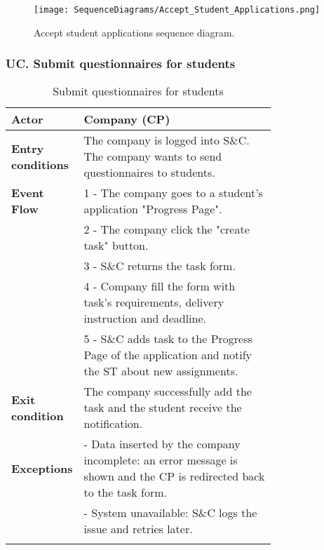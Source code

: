 \begin{figure}[H]
    \begin{center}
        \texttt{[image: SequenceDiagrams/Accept\_Student\_Applications.png]}
        \caption{Accept student applications sequence diagram.}
        \label{fig:accept_student_applications_seqd}%
    \end{center}
\end{figure}

\subsubsection*{UC\cuc . Submit questionnaires for students}
\begin{center}
    \begin{longtable}{|l|p{0.75\linewidth}|}
        \hline
        \textbf{Actor}            & Company (CP)\\
        \hline
        \textbf{Entry conditions} & The company is logged into S\&C. The company wants to send questionnaires to students.\\
        \hline
        \textbf{Event Flow}     & 1 - The company goes to a student’s application "Progress Page". \\
                                & 2 - The company click the "create task" button. \\
                                & 3 - S\&C returns the task form.\\
                                & 4 - Company fill the form with task’s requirements, delivery instruction and deadline.\\
                                & 5 -  S\&C adds task to the Progress Page of the application and notify the ST about new assignments.\\
        \hline
        \textbf{Exit condition}     & The company successfully add the task and the student receive the notification.\\       
        \hline
        \textbf{Exceptions}     & - Data inserted by the company incomplete: an error message is shown and the CP is redirected back to the task form. \\
                                & - System unavailable: S\&C logs the issue and retries later. \\
        \hline
        \caption{Submit questionnaires for students}
        \label{tab: submit_questionnaires_for_students_usecase}
    \end{longtable}
\end{center}

